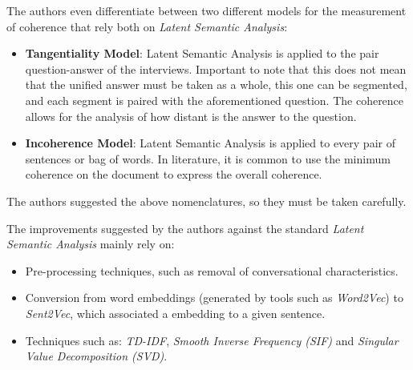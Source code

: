 \documentclass{Paper_Summary}
\begin{document}
    The authors even differentiate between two different models for the measurement of coherence that rely both on \emph{Latent Semantic Analysis}:
    \begin{itemize}
        \item \textbf{Tangentiality Model}: Latent Semantic Analysis is applied to the pair question-answer of the interviews. Important to note that this does not mean that the unified answer must be taken as a whole, this one can be segmented, and each segment is paired with the aforementioned question. The coherence allows for the analysis of how distant is the answer to the question.
        \item \textbf{Incoherence Model}: Latent Semantic Analysis is applied to every pair of sentences or bag of words. In literature, it is common to use the minimum coherence on the document to express the overall coherence.
    \end{itemize}
    The authors suggested the above nomenclatures, so they must be taken carefully. 

    The improvements suggested by the authors against the standard \emph{Latent Semantic Analysis} mainly rely on:
    \begin{itemize}
        \item Pre-processing techniques, such as removal of conversational characteristics.
        \item Conversion from word embeddings (generated by tools such as \emph{Word2Vec}) to \emph{Sent2Vec}, which associated a embedding to a given sentence.
        \item Techniques such as: \emph{TD-IDF}, \emph{Smooth Inverse Frequency (SIF)} and \emph{Singular Value Decomposition (SVD)}.
    \end{itemize}

\breakline

\newpage
\end{document}
